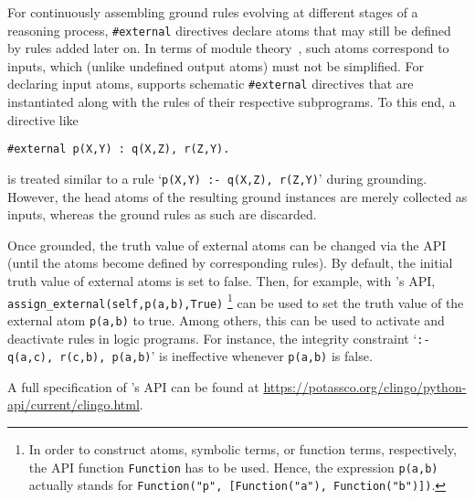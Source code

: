 For continuously assembling ground rules evolving at different stages of a
reasoning process, \lstinline{#external} directives declare atoms that may
still be defined by rules added later on.
%
In terms of module theory~\cite{oikjan06a},
such atoms correspond to inputs, which (unlike undefined output atoms) must not be simplified.
For declaring input atoms, 
\clingo{} supports schematic \lstinline{#external} directives that are instantiated along with
the rules of their respective subprograms.
To this end, a directive like
%
\begin{lstlisting}[numbers=none,language=clingo]
#external p(X,Y) : q(X,Z), r(Z,Y).
\end{lstlisting}
%
is treated similar to a rule
%
`\lstinline{p(X,Y) :- q(X,Z), r(Z,Y)}'
during grounding.
%
However, the head atoms of the resulting ground instances are merely collected as inputs,
whereas the ground rules as such are discarded.

Once grounded, the truth value of external atoms can be changed via the \clingo{} API
(until the atoms become defined by corresponding rules).
By default, the initial truth value of external atoms is set to false.
Then, for example, with \clingo's \python{} API,
\lstinline{assign_external(self,p(a,b),True)}%
\footnote{%
In order to construct atoms, symbolic terms, or function terms, respectively, the \clingo{} API function \lstinline{Function} has to be used.
Hence, the expression \lstinline{p(a,b)} actually stands for \lstinline{Function("p", [Function("a"), Function("b")])}.}
can be used to set the truth value of the external atom \lstinline{p(a,b)} to true.
Among others,
this can be used to activate and deactivate rules in logic programs.
For instance,
the integrity constraint `\lstinline{:- q(a,c), r(c,b), p(a,b)}' is ineffective whenever \lstinline{p(a,b)} is false.

A full specification of \clingo's \python{} API can be found at \url{https://potassco.org/clingo/python-api/current/clingo.html}.

